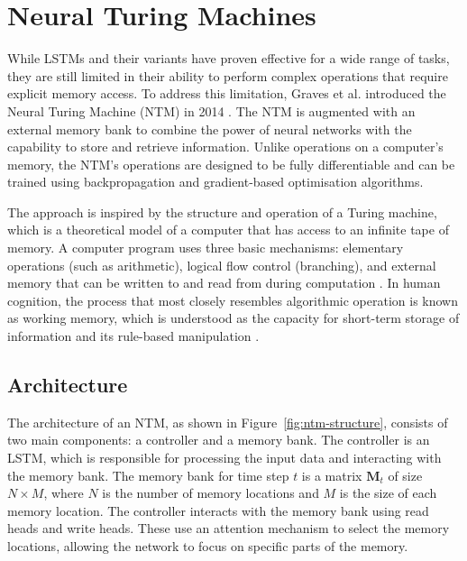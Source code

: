 \documentclass{article}
\newcommand{\reffig}[1]{Figure~\ref{#1}}
\begin{document}
\section{Neural Turing Machines}
\label{ch:4}

While LSTMs and their variants have proven effective for a wide range of tasks, they are
still limited in their ability to perform complex operations that require explicit memory
access. To address this limitation, Graves et al. introduced the Neural Turing Machine
(NTM) in 2014 \cite{gravesNeuralTuringMachines2014}. The NTM is augmented with an external
memory bank to combine the power of neural networks with the capability to store and
retrieve information. Unlike operations on a computer's memory, the NTM's operations are
designed to be fully differentiable and can be trained using backpropagation and
gradient-based optimisation algorithms.

The approach is inspired by the structure and operation of a Turing machine, which is a
theoretical model of a computer that has access to an infinite tape of memory. A computer
program uses three basic mechanisms: elementary operations (such as arithmetic), logical
flow control (branching), and external memory that can be written to and read from during
computation \cite{von_neumann_first_1945}. In human cognition, the process that most
closely resembles algorithmic operation is known as working memory, which is understood as
the capacity for short-term storage of information and its rule-based manipulation
\cite{baddeley_memory_2009}.


\subsection{Architecture}
\label{sec:4.0}

The architecture of an NTM, as shown in \reffig{fig:ntm-structure}, consists of two main
components: a controller and a memory bank. The controller is an LSTM, which is
responsible for processing the input data and interacting with the memory bank. The memory
bank for time step $t$ is a matrix $\textbf{M}_t$ of size $N \times M$, where $N$ is the
number of memory locations and $M$ is the size of each memory location. The controller
interacts with the memory bank using read heads and write heads. These use an attention
mechanism to select the memory locations, allowing the network to focus on specific parts
of the memory.
\end{document}
